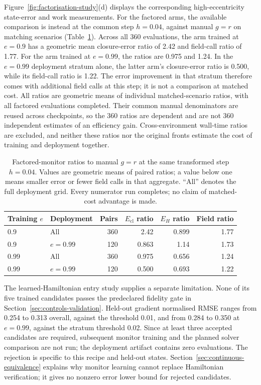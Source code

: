 \documentclass[final,3p,times]{elsarticle}
\begin{document}
Figure~\ref{fig:factorisation-study}(d) displays the corresponding
high-eccentricity state-error and work measurements.
For the factored arms, the available comparison is instead at the common
step $h=0.04$, against manual $g=r$ on matching scenarios
(Table~\ref{tab:factored-cost}). Across all 360 evaluations, the arm
trained at $e=0.9$ has a geometric mean closure-error ratio of 2.42 and
field-call ratio of 1.77. For the arm trained at $e=0.99$, the ratios are
0.975 and 1.24. In the $e=0.99$ deployment stratum alone, the latter
arm's closure-error ratio is 0.500, while its field-call ratio is 1.22.
The error improvement in that stratum therefore comes with additional
field calls at this step; it is not a comparison at matched cost.
All ratios are geometric means of individual matched-scenario ratios,
with all factored evaluations completed. Their common manual denominators
are reused across checkpoints, so the 360 ratios are dependent and are
not 360 independent estimates of an efficiency gain. Cross-environment
wall-time ratios are excluded, and neither these ratios nor the original
fronts estimate the cost of training and deployment together.

\begin{table}[t]
\centering
\caption{Factored-monitor ratios to manual $g=r$ at the same transformed
step $h=0.04$. Values are geometric means of paired ratios; a value below
one means smaller error or fewer field calls in that aggregate.
``All'' denotes the full deployment grid. Every numerator run completes;
no claim of matched-cost advantage is made.}
\label{tab:factored-cost}
\begingroup
\renewcommand{\baselinestretch}{1}\small
\setlength{\tabcolsep}{4pt}
\begin{tabular}{llrrrr}
\toprule
Training $e$ & Deployment & Pairs & $E_{\mathrm{cl}}$ ratio & $E_H$ ratio & Field ratio \\
\midrule
0.9 & All & 360 & 2.42 & 0.899 & 1.77 \\
0.9 & $e=0.99$ & 120 & 0.863 & 1.14 & 1.73 \\
0.99 & All & 360 & 0.975 & 0.656 & 1.24 \\
0.99 & $e=0.99$ & 120 & 0.500 & 0.693 & 1.22 \\
\bottomrule
\end{tabular}
\endgroup
\end{table}

The learned-Hamiltonian entry study supplies a separate limitation.
None of its five trained candidates passes the predeclared fidelity
gate in Section~\ref{sec:controls-validation}. Held-out gradient
normalised RMSE ranges from 0.254 to 0.313 overall, against the threshold
0.01, and from 0.284 to 0.350 at $e=0.99$, against the stratum threshold
0.02. Since at least three accepted candidates are required, subsequent
monitor training and the planned solver comparison are not run; the
deployment artifact contains zero evaluations. The rejection is specific to this recipe and held-out states.
Section~\ref{sec:continuous-equivalence} explains why monitor learning
cannot replace Hamiltonian verification; it gives no nonzero error lower
bound for rejected candidates.
\end{document}
